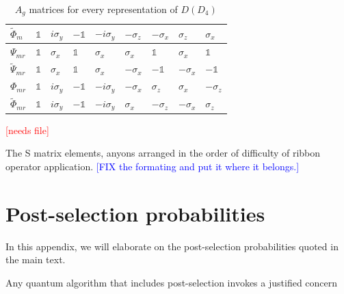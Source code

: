 \documentclass[two column]{article}
\newcommand{\caro}[1]{\textcolor{red}{[#1]}}
\newcommand{\jovan}[1]{\textcolor{blue}{[#1]}}
\begin{document}
\begin{table}[]
\begin{tabular}{|l||l|l|l|l|l|l|l|l|}
 $\tilde{\Phi}_{m}$ &$\mathbb{1}$&$i\sigma_y$ &$-\mathbb{1}$& $-i\sigma_y$ &$-\sigma_z$ &$-\sigma_x$ &  $\sigma_z$ &   $\sigma_x$ \\\hline
$\Psi_{mr}$ &$\mathbb{1}$&  $\sigma_x$ & $\mathbb{1}$&  $\sigma_x$ & $\sigma_x$ & $\mathbb{1}$&  $\sigma_x$ &   $\mathbb{1}$\\\hline
$\tilde{\Psi}_{mr}$ &$\mathbb{1}$&  $\sigma_x$ & $\mathbb{1}$&  $\sigma_x$ &$-\sigma_x$ &$-\mathbb{1}$& $-\sigma_x$ &  $-\mathbb{1}$\\\hline
$\Phi_{mr}$ &$\mathbb{1}$&$i\sigma_y$ &$-\mathbb{1}$& $-i\sigma_y$ &$-\sigma_x$ & $\sigma_z$ &  $\sigma_x$ &  $-\sigma_z$ \\\hline
$\tilde{\Phi}_{mr}$ &$\mathbb{1}$&$i\sigma_y$ &$-\mathbb{1}$& $-i\sigma_y$ & $\sigma_x$ &$-\sigma_z$ & $-\sigma_x$ &   $\sigma_z$ \\\hline
\end{tabular}
    \caption{$A_g$ matrices for every representation of $D(D_4)$}
    \label{tab:reps}
\end{table}


\begin{table}
\centering
\caro{needs file}
\caption{The S matrix elements, anyons arranged in the order of difficulty of ribbon operator application. \jovan{FIX the formating and put it where it belongs.}}
\end{table}




\section{Post-selection probabilities}\label{app:postsel}
In this appendix, we will elaborate on the post-selection probabilities quoted in the main text.

Any quantum algorithm that includes post-selection invokes a justified concern  
\end{document}
